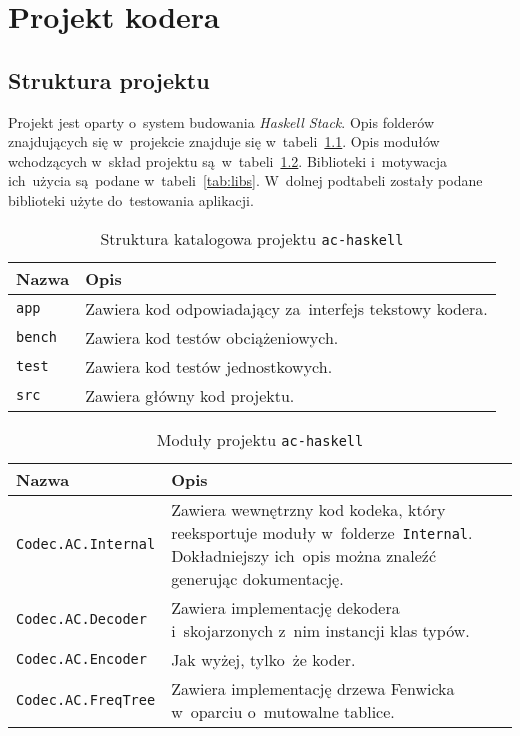 \documentclass[../../praca.tex]{subfiles}
\begin{document}
\chapter{Projekt kodera}

\section{Struktura projektu}

Projekt jest oparty o~system budowania \emph{Haskell Stack}.
Opis folderów znajdujących się w~projekcie znajduje się w~tabeli~\ref{tab:directories}.
Opis modułów wchodzących w~skład projektu są~w~tabeli~\ref{tab:modules}.
Biblioteki i~motywacja ich~użycia są~podane w~tabeli~\ref{tab:libs}.
W~dolnej podtabeli zostały podane biblioteki użyte do~testowania
aplikacji.

\begin{table}
  \centering
  \begin{tabular}{|l|p{8cm}|}
    \hline
    Nazwa & Opis \\ \hline
    \texttt{app}                & Zawiera kod odpowiadający za~interfejs tekstowy kodera. \\ \hline
    \texttt{bench}              & Zawiera kod testów obciążeniowych. \\ \hline
    \texttt{test}               & Zawiera kod testów jednostkowych. \\ \hline
    \texttt{src}                & Zawiera główny kod projektu. \\ \hline 
  \end{tabular}
  \caption{Struktura katalogowa projektu \texttt{ac-haskell}}
  \label{tab:directories}
\end{table}

\begin{table}
  \centering
  \begin{tabular}{|l|p{8cm}|}
    \hline 
    Nazwa & Opis \\ \hline
    \texttt{Codec.AC.Internal}  & Zawiera wewnętrzny kod kodeka, który reeksportuje
                                  moduły w~folderze~\texttt{Internal}. Dokładniejszy
                                  ich~opis można znaleźć generując dokumentację.\\ \hline
    \texttt{Codec.AC.Decoder}   & Zawiera implementację dekodera 
                                  i~skojarzonych z~nim instancji klas typów. \\ \hline
    \texttt{Codec.AC.Encoder}   & Jak wyżej, tylko~że koder. \\ \hline
    \texttt{Codec.AC.FreqTree}  & Zawiera implementację drzewa Fenwicka w~oparciu 
                                  o~mutowalne tablice. \\ \hline
  \end{tabular}
  \caption{Moduły projektu \texttt{ac-haskell}}
  \label{tab:modules}
\end{table}
\end{document}
